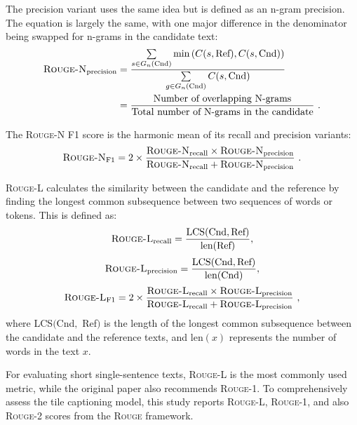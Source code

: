 \documentclass{l4proj}
\begin{document}
The precision variant uses the same idea but is defined as an n-gram precision. The equation is largely the same, with one major difference in the denominator being swapped for n-grams in the candidate text:
\begin{equation}
\begin{split}    
    \textsc{Rouge-N}_{\text{precision}} &= \frac{\sum\limits_{s \in G_n(\text{Cnd})}\min\left( C(s, \text{Ref}), C(s, \text{Cnd})\right)}{\sum\limits_{g \in G_n(\text{Cnd})}C(s, \text{Cnd})} \\
    &= \frac{\text{Number of overlapping N-grams}}{\text{Total number of N-grams in the candidate}}\ .
\end{split}
\end{equation}

The \textsc{Rouge-N} F1 score is the harmonic mean of its recall and precision variants:
\begin{equation}
    \textsc{Rouge-N}_{\text{F1}} = 2 \times \frac{\textsc{Rouge-N}_{\text{recall}} \times \textsc{Rouge-N}_{\text{precision}}}{\textsc{Rouge-N}_\text{recall} + \textsc{Rouge-N}_\text{precision}}\ .
\end{equation}

\textsc{Rouge-L} calculates the similarity between the candidate and the reference by finding the longest common subsequence between two sequences of words or tokens. This is defined as:
\begin{equation}
    \textsc{Rouge-L}_\text{recall} = \frac{\text{LCS}(\text{Cnd}, \text{Ref})}{\text{len}(\text{Ref})},
\end{equation}
\begin{equation}
    \textsc{Rouge-L}_{\text{precision}} = \frac{\text{LCS}(\text{Cnd}, \text{Ref})}{\text{len}(\text{Cnd})},
\end{equation}
\begin{equation}
    \textsc{Rouge-L}_{\text{F1}} = 2 \times \frac{\textsc{Rouge-L}_\text{recall} \times \textsc{Rouge-L}_\text{precision}}{\textsc{Rouge-L}_\text{recall} + \textsc{Rouge-L}_\text{precision}}\ ,
\end{equation}
where LCS$($Cnd$,$ Ref$)$ is the length of the longest common subsequence between the candidate and the reference texts, and len$(x)$ represents the number of words in the text $x$.

For evaluating short single-sentence texts, \textsc{Rouge-L} is the most commonly used metric, while the original paper also recommends \textsc{Rouge-1}. To comprehensively assess the tile captioning model, this study reports \textsc{Rouge-L}, \textsc{Rouge-1}, and also \textsc{Rouge-2} scores from the \textsc{Rouge} framework.
\end{document}

